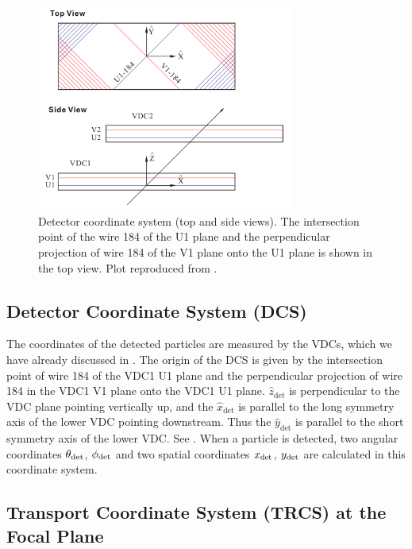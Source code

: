 \begin{figure}[b!]
  \centering
  \includegraphics[width=0.75\textwidth]{figs/DCS.png}
  \caption[Detector coordinate system.]{Detector coordinate system (top and side views). The intersection point of the wire 184 of the U1 plane and the perpendicular projection of wire 184 of the V1 plane onto the U1 plane is shown in the top view. Plot reproduced from \cite{Qiang2007}. \label{C6S1F3}}
\end{figure}

\subsection[Detector Coordinate System]{Detector Coordinate System (DCS)}

The coordinates of the detected particles are measured by the VDCs, which we have already discussed in . The origin of the DCS is given by the intersection point of wire 184 of the VDC1 U1 plane and the perpendicular projection of wire 184 in the VDC1 V1 plane onto the VDC1 U1 plane. $\hat{z}_{\mathrm{det}}$ is perpendicular to the VDC plane pointing vertically up, and the $\hat{x}_{\mathrm{det}}$ is parallel to the long symmetry axis of the lower VDC pointing downstream. Thus the $\hat{y}_{\mathrm{det}}$ is parallel to the short symmetry axis of the lower VDC. See . When a particle is detected, two angular coordinates $\theta_{\mathrm{det}}$, $\phi_{\mathrm{det}}$ and two spatial coordinates $x_{\mathrm{det}}$, $y_{\mathrm{det}}$ are calculated in this coordinate system.

\subsection[Transport Coordinate System at the Focal Plane]{Transport Coordinate System (TRCS) at the Focal Plane}

